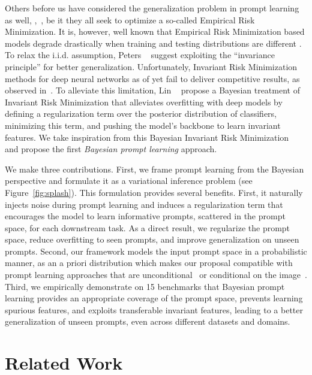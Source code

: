 \documentclass[10pt,twocolumn,letterpaper]{article}
\begin{document}
Others before us have considered the generalization problem in prompt learning as well, \eg,~\cite{zhou2022learning, zhou2022conditional}, be it they all seek to optimize a so-called Empirical Risk Minimization. It is, however, well known that Empirical Risk Minimization based models degrade drastically when training and testing distributions are different \cite{peters2016causal,arjovsky2019invariant}. To relax the i.i.d. assumption, Peters \etal~\cite{peters2016causal} suggest exploiting the ``invariance principle'' for better generalization. Unfortunately, Invariant Risk Minimization methods for deep neural networks as of yet fail to deliver competitive results, as observed in~\cite{gulrajani2020search, lin2021empirical, lin2022bayesian}. To alleviate this limitation, Lin \etal~\cite{lin2022bayesian} propose a Bayesian treatment of Invariant Risk Minimization that alleviates overfitting with deep models by defining a regularization term over the posterior distribution of classifiers, minimizing this term, and pushing the model's backbone to learn invariant features. We take inspiration from this Bayesian Invariant Risk Minimization~\cite{lin2022bayesian} and propose the first \textit{Bayesian prompt learning} approach. 

We make three contributions. First, we frame prompt learning from the Bayesian perspective and formulate it as a variational inference problem (see Figure~\ref{fig:splash}). This formulation provides several benefits. First, it naturally injects noise during prompt learning and induces a regularization term that encourages the model to learn informative prompts, scattered in the prompt space, for each downstream task. As a direct result, we regularize the prompt space, reduce overfitting to seen prompts, and improve  generalization on unseen prompts. Second, our framework models the input prompt space in a probabilistic manner, as an a priori distribution which makes our proposal compatible with prompt learning approaches that are unconditional~\cite{zhou2022learning} or conditional on the image~\cite{zhou2022conditional}. 
Third, we empirically demonstrate on 15 benchmarks that Bayesian prompt learning provides an appropriate coverage of the prompt space, prevents learning spurious features, and exploits transferable invariant features, leading to a better generalization of unseen prompts, even across different datasets and domains. 



 
\section{Related Work}
\label{sec:related}
\vspace{-0.5em}
\end{document}
